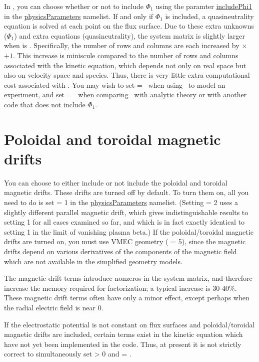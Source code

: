 In \sfincs, you can choose whether or not to
include $\Phi_1$ using the paramter {\ttfamily \hyperlink{includePhi1}{includePhi1}} in the 
{\ttfamily \hyperref[sec:physicsParameters]{physicsParameters}}
namelist.  If and only if $\Phi_1$ is included, a quasineutrality equation is solved
at each point on the flux surface.  Due to these extra unknowns ($\Phi_1$) and extra equations
(quasineutrality), the system matrix is slightly larger when  is \true.
Specifically, the number of rows and columns are each increased by \Ntheta$\times$\Nzeta$+1$.  This increase is miniscule compared
to the number of rows and columns associated with the kinetic equation, which depends not only on real space
but also on velocity space and species.  Thus, there is very little extra computational cost associated
with .  You may wish to set  = \true~when
using \sfincs~to model an experiment, and set  = \false~when
comparing \sfincs~with analytic theory or with another code that does not include $\Phi_1$.

\section{Poloidal and toroidal magnetic drifts}

You can choose to either include or not include the poloidal and toroidal magnetic drifts.
These drifts are turned off by default.  To turn them on, all you need to do is
set  = 1 in the {\ttfamily \hyperref[sec:physicsParameters]{physicsParameters}} namelist.
(Setting  = 2 uses a slightly different parallel magnetic drift, which gives
indistinguishable results to setting 1 for all cases examined so far, and which is in fact exactly identical to setting 1
in the limit of vanishing plasma beta.)
If the poloidal/toroidal magnetic drifts are turned on, you must use VMEC
geometry ( = 5), since the magnetic drifts
depend on various derivatives of the components of the magnetic field which
are not available in the simplified geometry models.

The magnetic drift terms introduce nonzeros in the system matrix,
and therefore increase the memory required for factorization; a typical increase is 30-40\%.
These magnetic drift terms often have only a minor effect, except perhaps when the radial
electric field is near 0.

If the electrostatic potential is not constant on flux surfaces and poloidal/toroidal magnetic drifts
are included, certain terms exist in the kinetic equation which have not yet been implemented in the code.
Thus, at present it is not strictly correct to simultaneously set   > 0 
and   = \true.


